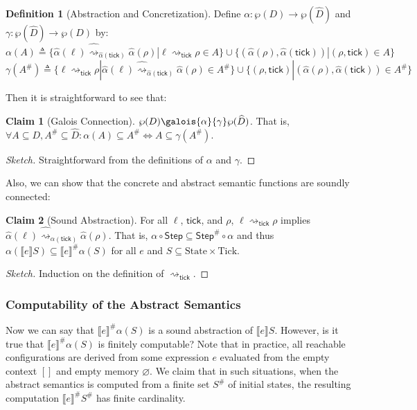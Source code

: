 \documentclass{article}
\theoremstyle{definition}
\newtheorem{definition}{Definition}[section]
\newtheorem{clm}{Claim}[section]
\newcommand*{\A}[1]{\widehat{#1}}
\newcommand*{\Abs}[1]{{#1}^{\#}}
\newcommand*{\State}{\text{State}}
\newcommand*{\Tick}{\text{Tick}}
\newcommand*{\Step}{\mathsf{Step}}
\newcommand*{\semarrow}{\rightsquigarrow}
\newcommand*{\asemarrow}{\widehat{\rightsquigarrow}}
\newcommand*{\sembracket}[1]{\lBrack{#1}\rBrack}
\newcommand*{\tick}{\mathsf{tick}}
\begin{document}
\begin{definition}[Abstraction and Concretization]
  Define $\alpha:\wp(D)\rightarrow\wp(\A{D})$ and $\gamma:\wp(\A{D})\rightarrow\wp(D)$ by:
  \[
    \alpha(A)\triangleq\{\A\alpha(\ell)\asemarrow_{\A\alpha(\tick)}\A\alpha(\rho)|\ell\semarrow_\tick\rho\in A\}\cup\{(\A\alpha(\rho),\A\alpha(\tick))|(\rho,\tick)\in A\}
  \]
  \[
    \gamma(\Abs{A})\triangleq\{\ell\semarrow_\tick\rho|\A\alpha(\ell)\asemarrow_{\A\alpha(\tick)}\A\alpha(\rho)\in\Abs{A}\}\cup\{(\rho,\tick)|(\A\alpha(\rho),\A\alpha(\tick))\in\Abs{A}\}
  \]
\end{definition}

Then it is straightforward to see that:
\begin{clm}[Galois Connection]
  $\wp(D)\galois{\alpha}{\gamma}\wp(\A{D})$. That is, $\forall A\subseteq D,\Abs{A}\subseteq\A{D}:\alpha(A)\subseteq\Abs{A}\Leftrightarrow A\subseteq\gamma(\Abs{A})$.
\end{clm}
\begin{proof}[Sketch]
  Straightforward from the definitions of $\alpha$ and $\gamma$.
\end{proof}

Also, we can show that the concrete and abstract semantic functions are soundly connected:
\begin{clm}[Sound Abstraction]
  For all $\ell$, $\tick$, and $\rho$, $\ell\semarrow_{\tick}\rho$ implies $\A\alpha(\ell)\asemarrow_{\A\alpha(\tick)}\A\alpha(\rho)$.
  That is, $\alpha\circ\Step\subseteq\Abs\Step\circ\alpha$ and thus $\alpha(\sembracket{e}S)\subseteq\Abs{\sembracket{e}}\alpha(S)$ for all $e$ and $S\subseteq\State\times\Tick$.
\end{clm}
\begin{proof}[Sketch]
  Induction on the definition of $\semarrow_{\tick}$.
\end{proof}

\subsubsection{Computability of the Abstract Semantics}
Now we can say that $\Abs{\sembracket{e}}\alpha(S)$ is a sound abstraction of $\sembracket{e}S$.
However, is it true that $\Abs{\sembracket{e}}\alpha(S)$ is finitely computable?
Note that in practice, all reachable configurations are derived from some expression $e$ evaluated from the empty context $[]$ and empty memory $\varnothing$.
We claim that in such situations, when the abstract semantics is computed from a finite set $\Abs{S}$ of initial states, the resulting computation $\Abs{\sembracket{e}}\Abs{S}$ has finite cardinality.
\end{document}
